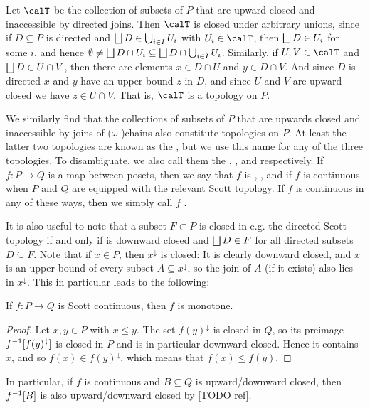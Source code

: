 \documentclass[a4paper, 11pt, article, danish, oneside]{memoir}
\DeclarePairedDelimiter{\auxdelimbracket}{[}{]}
\DeclareMathOperator*{\smallbigsqcup}{\textstyle\bigsqcup}
\DeclareMathOperator*{\bigdjoin}{\mathchoice
    {\smallbigsqcup}%
    {\bigsqcup}%
    {\bigsqcup}%
    {\bigsqcup}%
}
\newcommand*\intersect\cap
\DeclareMathOperator*{\smallbigcup}{\textstyle\bigcup}
\DeclareMathOperator*{\bigunion}{\mathchoice
    {\smallbigcup}%
    {\bigcup}%
    {\bigcup}%
    {\bigcup}%
}
\newcommand{\preim}[2][]{^{-1}\auxdelimbracket[#1]{#2}}
\begin{document}
Let $\calT$ be the collection of subsets of $P$ that are upward closed and inaccessible by directed joins. Then $\calT$ is closed under arbitrary unions, since if $D \subseteq P$ is directed and $\bigdjoin D \in \bigunion_{i \in I} U_i$ with $U_i \in \calT$, then $\bigdjoin D \in U_i$ for some $i$, and hence $\emptyset \neq \bigdjoin D \intersect U_i \subseteq \bigdjoin D \intersect \bigunion_{i \in I} U_i$. Similarly, if $U,V \in \calT$ and $\bigdjoin D \in U \intersect V$, then there are elements $x \in D \intersect U$ and $y \in D \intersect V$. And since $D$ is directed $x$ and $y$ have an upper bound $z$ in $D$, and since $U$ and $V$ are upward closed we have $z \in U \intersect V$. That is, $\calT$ is a topology on $P$.

We similarly find that the collections of subsets of $P$ that are upwards closed and inaccessible by joins of ($\omega$-)chains also constitute topologies on $P$. At least the latter two topologies are known as the , but we use this name for any of the three topologies. To disambiguate, we also call them the \keyword{$\omega$-}, , and  respectively. If $f \colon P \to Q$ is a map between posets, then we say that $f$ is \keyword{$\omega$-}, , and  if $f$ is continuous when $P$ and $Q$ are equipped with the relevant Scott topology. If $f$ is continuous in any of these ways, then we simply call $f$ .

It is also useful to note that a subset $F \subset P$ is closed in e.g. the directed Scott topology if and only if is downward closed and $\bigdjoin D \in F$ for all directed subsets $D \subseteq F$. Note that if $x \in P$, then $x^\downarrow$ is closed: It is clearly downward closed, and $x$ is an upper bound of every subset $A \subseteq x^\downarrow$, so the join of $A$ (if it exists) also lies in $x^\downarrow$. This in particular leads to the following:

\begin{lemma}
    If $f \colon P \to Q$ is Scott continuous, then $f$ is monotone.
\end{lemma}

\begin{proof}
    Let $x,y \in P$ with $x \leq y$. The set $f(y)^\downarrow$ is closed in $Q$, so its preimage $f\preim{f(y)^\downarrow}$ is closed in $P$ and is in particular downward closed. Hence it contains $x$, and so $f(x) \in f(y)^\downarrow$, which means that $f(x) \leq f(y)$.
\end{proof}
%
In particular, if $f$ is continuous and $B \subseteq Q$ is upward/downward closed, then $f\preim{B}$ is also upward/downward closed by [TODO ref].
\end{document}
